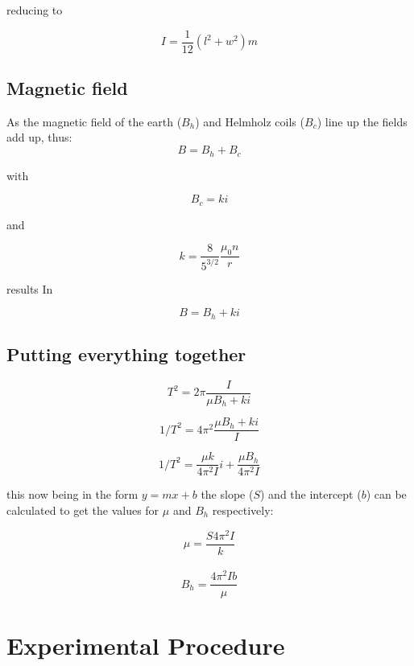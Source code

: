 \documentclass[14pt]{article}
\begin{document}
reducing to

\begin{equation}\label{eq_I}
I = \frac{1}{12}(l^2 + w^2) m
\end{equation}

\subsection{Magnetic field}

As the magnetic field of the earth ($B_h$) and Helmholz coils ($B_c$) line up the fields add up, thus:
$$
B = B_h + B_c
$$

with

\begin{equation}\label{eq_bc}
B_c = k i
\end{equation}

and 

\begin{equation}\label{eq_k}
k = \frac{8}{5^{3/2}} \frac{\mu_0 n}{r}
\end{equation}

results In

$$
B = B_h + k i
$$

\subsection{Putting everything together}


$$
T^2 = 2 \pi {\frac{I}{\mu B_{h} + k i}}
$$

$$
1/T^2 = 4 \pi^2 {\frac{\mu B_h + k i}{I}}
$$

\begin{equation}\label{eq_mbx}
1/T^2 = \frac{\mu k}{4 \pi^2 I}i + \frac{\mu B_h}{4 \pi^2 I}
\end{equation}

this now being in the form $y = mx + b$ the slope ($S$) and the intercept ($b$) can be calculated to get the values
for $\mu$ and $B_h$ respectively:

\begin{equation}\label{eq_mu}
 \mu = \frac{S 4 \pi^2 I }{k}
\end{equation}
\\
\begin{equation}\label{eq_bh}
B_h = \frac{4 \pi^2 I b }{\mu }
\end{equation}

\section{Experimental Procedure}
\end{document}
